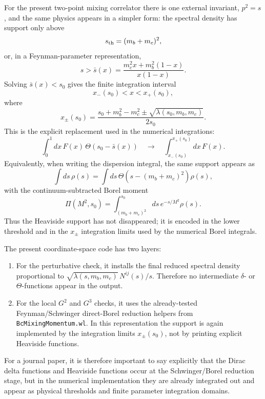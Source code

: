 \documentclass[11pt]{article}
\begin{document}
For the present two-point mixing correlator there is one external invariant,
\(p^2=s\), and the same physics appears in a simpler form: the spectral density
has support only above
\begin{equation}
  s_{\rm th}=(m_b+m_c)^2,
\end{equation}
or, in a Feynman-parameter representation,
\begin{equation}
  s >
  \bar s(x)
  =
  \frac{m_c^2x+m_b^2(1-x)}{x(1-x)} .
\end{equation}
Solving \(\bar s(x)<s_0\) gives the finite integration interval
\begin{equation}
  x_-(s_0)<x<x_+(s_0),
\end{equation}
where
\begin{equation}
  x_\pm(s_0)
  =
  \frac{s_0+m_b^2-m_c^2
  \pm\sqrt{\lambda(s_0,m_b,m_c)}}{2s_0}.
\end{equation}
This is the explicit replacement used in the numerical integrations:
\begin{equation}
  \int_0^1 dx\,
  F(x)\,
  \Theta\!\left(s_0-\bar s(x)\right)
  \quad\longrightarrow\quad
  \int_{x_-(s_0)}^{x_+(s_0)}dx\,F(x).
\end{equation}
Equivalently, when writing the dispersion integral, the same support appears
as
\begin{equation}
  \int ds\,\rho(s)
  =
  \int ds\,
  \Theta\!\left(s-(m_b+m_c)^2\right)
  \rho(s),
\end{equation}
with the continuum-subtracted Borel moment
\begin{equation}
  \Pi(M^2,s_0)
  =
  \int_{(m_b+m_c)^2}^{s_0}
  ds\,e^{-s/M^2}\rho(s).
\end{equation}
Thus the Heaviside support has not disappeared; it is encoded in the lower
threshold and in the \(x_\pm\) integration limits used by the numerical Borel
integrals.

The present coordinate-space code has two layers:
\begin{enumerate}
  \item For the perturbative check, it installs the final reduced spectral
  density proportional to
  \(\sqrt{\lambda(s,m_b,m_c)}\,N^{ij}(s)/s\).  Therefore no intermediate
  \(\delta\)- or \(\Theta\)-functions appear in the output.
  \item For the local \(G^2\) and \(G^3\) checks, it uses the already-tested
  Feynman/Schwinger direct-Borel reduction helpers from
  \texttt{BcMixingMomentum.wl}.  In this representation the support is again
  implemented by the integration limits \(x_\pm(s_0)\), not by printing
  explicit Heaviside functions.
\end{enumerate}
For a journal paper, it is therefore important to say explicitly that the
Dirac delta functions and Heaviside functions occur at the Schwinger/Borel
reduction stage, but in the numerical implementation they are already
integrated out and appear as physical thresholds and finite parameter
integration domains.
\end{document}

